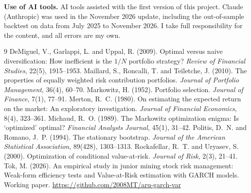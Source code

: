 \documentclass[11pt,a4paper]{article}
\begin{document}
\vspace{0.5\baselineskip}
{\small\noindent\textbf{Use of AI tools.} AI tools assisted with the first version of this project. Claude (Anthropic) was used in the November 2026 update, including the out-of-sample backtest on data from July 2025 to November 2026. I take full responsibility for the content, and all errors are my own.\par}

\begin{thebibliography}{9}
\setlength{\itemsep}{2pt}\small
{} DeMiguel, V., Garlappi, L. and Uppal, R. (2009). Optimal versus naive diversification: How inefficient is the $1/N$ portfolio strategy? \textit{Review of Financial Studies}, 22(5), 1915--1953.
 Maillard, S., Roncalli, T. and Te\"iletche, J. (2010). The properties of equally weighted risk contribution portfolios. \textit{Journal of Portfolio Management}, 36(4), 60--70.
 Markowitz, H. (1952). Portfolio selection. \textit{Journal of Finance}, 7(1), 77--91.
 Merton, R.~C. (1980). On estimating the expected return on the market: An exploratory investigation. \textit{Journal of Financial Economics}, 8(4), 323--361.
 Michaud, R.~O. (1989). The Markowitz optimization enigma: Is `optimized' optimal? \textit{Financial Analysts Journal}, 45(1), 31--42.
 Politis, D.~N. and Romano, J.~P. (1994). The stationary bootstrap. \textit{Journal of the American Statistical Association}, 89(428), 1303--1313.
 Rockafellar, R.~T. and Uryasev, S. (2000). Optimization of conditional value-at-risk. \textit{Journal of Risk}, 2(3), 21--41.
 Tok, M. (2026). An empirical study in junior mining stock risk management: Weak-form efficiency tests and Value-at-Risk estimation with GARCH models. Working paper. \url{https://github.com/2008MT/aru-garch-var}
\end{thebibliography}
\end{document}
